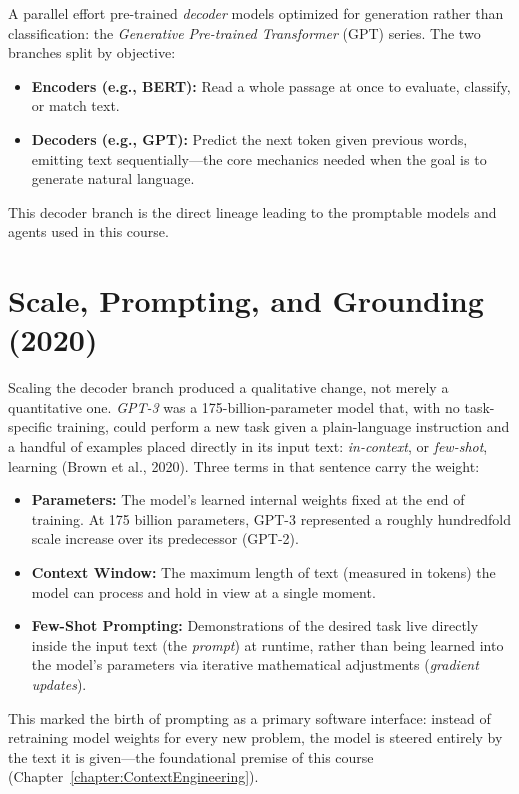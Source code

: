 A parallel effort pre-trained \emph{decoder} models optimized for generation rather than classification: the \emph{Generative Pre-trained Transformer} (GPT) series.
The two branches split by objective:
\begin{itemize}
    \item \textbf{Encoders (e.g., BERT):} Read a whole passage at once to evaluate, classify, or match text.
    \item \textbf{Decoders (e.g., GPT):} Predict the next token given previous words, emitting text sequentially—the core mechanics needed when the goal is to generate natural language.
\end{itemize}
This decoder branch is the direct lineage leading to the promptable models and agents used in this course.


\section{Scale, Prompting, and Grounding (2020)}
\label{section:ScaleAndGrounding}

Scaling the decoder branch produced a qualitative change, not merely a quantitative one.
\emph{GPT-3} was a 175-billion-parameter model that, with no task-specific training, could perform a new task given a plain-language instruction and a handful of examples placed directly in its input text: \emph{in-context}, or \emph{few-shot}, learning (Brown et al., 2020).
Three terms in that sentence carry the weight:
\begin{itemize}
    \item \textbf{Parameters:} The model's learned internal weights fixed at the end of training. At 175 billion parameters, GPT-3 represented a roughly hundredfold scale increase over its predecessor (GPT-2).
    \item \textbf{Context Window:} The maximum length of text (measured in tokens) the model can process and hold in view at a single moment.
    \item \textbf{Few-Shot Prompting:} Demonstrations of the desired task live directly inside the input text (the \emph{prompt}) at runtime, rather than being learned into the model's parameters via iterative mathematical adjustments (\emph{gradient updates}).
\end{itemize}
This marked the birth of prompting as a primary software interface: instead of retraining model weights for every new problem, the model is steered entirely by the text it is given—the foundational premise of this course (Chapter~\ref{chapter:ContextEngineering}).

